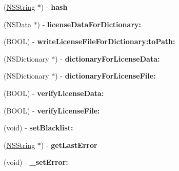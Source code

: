 \begin{DoxyCompactItemize}
\item 
\hypertarget{interface_aquatic_prime_a317025a50dcb9e025a0f98042c1987e4}{
(\hyperlink{class_n_s_string}{NSString} $\ast$) -\/ {\bfseries hash}}
\label{interface_aquatic_prime_a317025a50dcb9e025a0f98042c1987e4}

\item 
\hypertarget{interface_aquatic_prime_a271e3771274f450b5bd0b753ee0c6c8f}{
(\hyperlink{class_n_s_data}{NSData} $\ast$) -\/ {\bfseries licenseDataForDictionary:}}
\label{interface_aquatic_prime_a271e3771274f450b5bd0b753ee0c6c8f}

\item 
\hypertarget{interface_aquatic_prime_aa63463d04181d37d58a1e850cb4ad13e}{
(BOOL) -\/ {\bfseries writeLicenseFileForDictionary:toPath:}}
\label{interface_aquatic_prime_aa63463d04181d37d58a1e850cb4ad13e}

\item 
\hypertarget{interface_aquatic_prime_a2e9b8604d9a4ecfb00220e5f691979cc}{
(NSDictionary $\ast$) -\/ {\bfseries dictionaryForLicenseData:}}
\label{interface_aquatic_prime_a2e9b8604d9a4ecfb00220e5f691979cc}

\item 
\hypertarget{interface_aquatic_prime_a332ea8569d52504f509d3f00aff392d3}{
(NSDictionary $\ast$) -\/ {\bfseries dictionaryForLicenseFile:}}
\label{interface_aquatic_prime_a332ea8569d52504f509d3f00aff392d3}

\item 
\hypertarget{interface_aquatic_prime_a2d9f83f07bc65012cb0c50aeee80c46f}{
(BOOL) -\/ {\bfseries verifyLicenseData:}}
\label{interface_aquatic_prime_a2d9f83f07bc65012cb0c50aeee80c46f}

\item 
\hypertarget{interface_aquatic_prime_a0f27ac34304e58772ee37fb30af41aef}{
(BOOL) -\/ {\bfseries verifyLicenseFile:}}
\label{interface_aquatic_prime_a0f27ac34304e58772ee37fb30af41aef}

\item 
\hypertarget{interface_aquatic_prime_a3aaf317e389c694f7a4fdea39c649d8d}{
(void) -\/ {\bfseries setBlacklist:}}
\label{interface_aquatic_prime_a3aaf317e389c694f7a4fdea39c649d8d}

\item 
\hypertarget{interface_aquatic_prime_a64b11dee63fe00a16061745bbef45321}{
(\hyperlink{class_n_s_string}{NSString} $\ast$) -\/ {\bfseries getLastError}}
\label{interface_aquatic_prime_a64b11dee63fe00a16061745bbef45321}

\item 
\hypertarget{interface_aquatic_prime_a8c1e95fbedffe2a5d06b73586f958985}{
(void) -\/ {\bfseries \_\-setError:}}
\label{interface_aquatic_prime_a8c1e95fbedffe2a5d06b73586f958985}

\end{DoxyCompactItemize}
